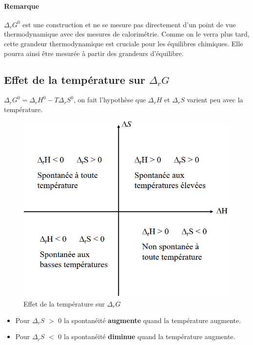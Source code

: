 \documentclass[10pt,a4paper]{book}
\begin{document}
\paragraph{Remarque} \(\Delta_rG^0\) est une construction et ne se mesure pas directement d’un point de vue thermodynamique avec des mesures de calorimétrie. Comme on le verra plus tard, cette grandeur thermodynamique est cruciale pour les équilibres chimiques. Elle pourra ainsi être mesurée à partir des grandeurs d’équilibre.

\subsection{Effet de la température sur $\Delta_rG$}

\textbf{\(\Delta_rG^0 = \Delta_rH^0 - T\Delta_rS^0\)}, on fait l'hypothèse que $\Delta_rH$ et $\Delta_rS$ varient peu avec la température.
\begin{figure}[h!]
\begin{center}
\includegraphics[scale=0.75]{./assets/temp_gibbs.png}
\caption{Effet de la température sur $\Delta_rG$}
\label{fig:temp_gibbs}
\end{center}
\end{figure}
\begin{itemize}
\item Pour $\Delta_rS$ $>$ 0 la spontanéité \textbf{augmente} quand la température augmente.
\item Pour $\Delta_rS$ $<$ 0 la spontanéité \textbf{diminue} quand la température augmente.
\end{itemize}
\end{document}
